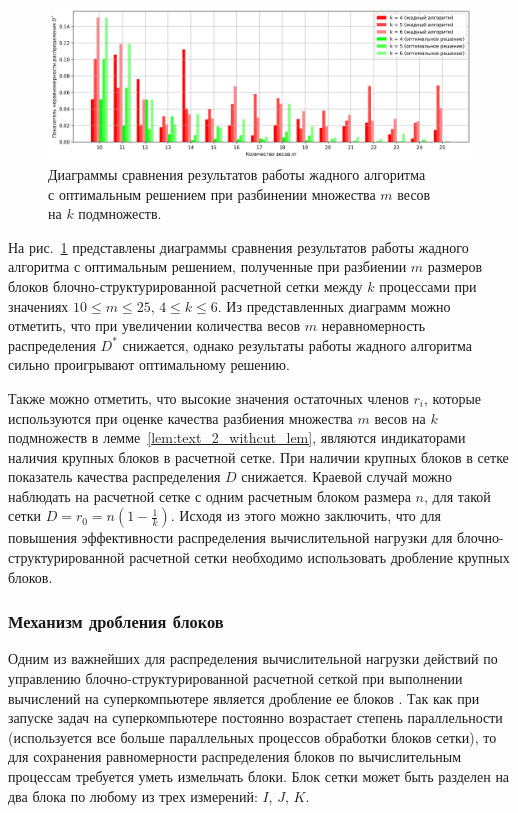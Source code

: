 \begin{figure}[ht]
\centering
\includegraphics[width=1.0\textwidth]{fig/par_blocks_distr_greedy_opt_cmp_graph.png}
\singlespacing
{}\caption{Диаграммы сравнения результатов работы жадного алгоритма \\ с оптимальным решением при разбинении множества $m$ весов \\ на $k$ подмножеств.}
\label{fig:par_blocks_distr_greedy_opt_cmp_graph}
\end{figure}

На рис.~\ref{fig:par_blocks_distr_greedy_opt_cmp_graph} представлены диаграммы сравнения результатов работы жадного алгоритма с оптимальным решением, полученные при разбиении $m$ размеров блоков блочно-структурированной расчетной сетки между $k$ процессами при значениях $10 \le m \le 25$, $4 \le k \le 6$.
Из представленных диаграмм можно отметить, что при увеличении количества весов $m$ неравномерность распределения $D^{*}$ снижается, однако результаты работы жадного алгоритма сильно проигрывают оптимальному решению.

Также можно отметить, что высокие значения остаточных членов $r_i$, которые используются при оценке качества разбиения множества $m$ весов на $k$ подмножеств в лемме~\ref{lem:text_2_withcut_lem}, являются индикаторами наличия крупных блоков в расчетной сетке.
При наличии крупных блоков в сетке показатель качества распределения $D$ снижается.
Краевой случай можно наблюдать на расчетной сетке с одним расчетным блоком размера $n$, для такой сетки $D = r_0 = n (1 - \frac{1}{k})$.
Исходя из этого можно заключить, что для повышения эффективности распределения вычислительной нагрузки для блочно-структурированной расчетной сетки необходимо использовать дробление крупных блоков.

\subsubsection{Механизм дробления блоков}

Одним из важнейших для распределения вычислительной нагрузки действий по управлению блочно-структурированной расчетной сеткой при выполнении вычислений на суперкомпьютере является дробление ее блоков \cite{Rybakov2016WithCut}.
Так как при запуске задач на суперкомпьютере постоянно возрастает степень параллельности (используется все больше параллельных процессов обработки блоков сетки), то для сохранения равномерности распределения блоков по вычислительным процессам требуется уметь измельчать блоки.
Блок сетки может быть разделен на два блока по любому из трех измерений: $I$, $J$, $K$.

